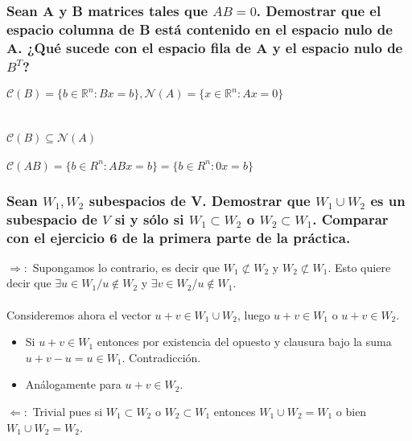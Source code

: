 \documentclass{article}
\begin{document}
\subsubsection{Sean A y B matrices tales que $AB=0$. Demostrar que el espacio columna de B está contenido en el
espacio nulo de A. ¿Qué sucede con el espacio fila de A y el espacio nulo de $B^T$?}
$\mathcal{C}(B) = \Big\{ b \in \mathbb{R}^n : Bx = b \Big \}, \mathcal{N}(A) = \Big \{ x \in \mathbb{R}^n : Ax = 0 \Big\}$ \\
\\
\\
$\mathcal{C}(B) \subseteq \mathcal{N}(A)$
\\
\\
$\mathcal{C}(AB) = \Big\{ b \in R^n : ABx = b \Big\} = \{ b \in R^n : 0x = b\}$
\\
\subsubsection{Sean $W_1,W_2$ subespacios de V. Demostrar que $W_1 \cup W_2$ es un subespacio de $V$ si y sólo si
$W_1 \subset W_2$ o $W_2 \subset W_1$. Comparar con el ejercicio 6 de la primera parte de la práctica.}
$\Rightarrow:$ Supongamos lo contrario, es decir que $W_1 \not \subset W_2$ y $W_2 \not \subset W_1.$ Esto
quiere decir que $\exists u \in W_1 / u \not \in W_2$ y $\exists v \in W_2 / u \not \in W_1$. \\ 
\\
Consideremos ahora el vector $u+v \in W_1 \cup W_2$, luego $u+v \in W_1$ o $u+v \in W_2$.
\begin{itemize}
	\item
		Si $u+v \in W_1$ entonces por existencia del opuesto y clausura bajo la suma $u+v-u = u \in W_1$.
		Contradicción.
	\item
		Análogamente para $u+v \in W_2$.
\end{itemize}
$\Leftarrow:$ Trivial pues si $W_1 \subset W_2$ o $W_2 \subset W_1$ entonces $W_1 \cup W_2 = W_1$ o bien
$W_1 \cup W_2 = W_2$.
\\
\end{document}

